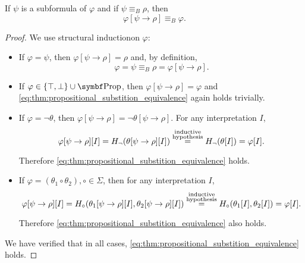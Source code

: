 \begin{proposition}\label{thm:propositional_substition_equivalence}
  If \( \psi \) is a subformula of \( \varphi \) and if \( \psi \equiv_B \rho \), then
  \begin{equation}\label{eq:thm:propositional_substition_equivalence}
    \varphi[\psi \to \rho] \equiv_B \varphi.
  \end{equation}
\end{proposition}
\begin{proof}
  We use structural induction\IND on \( \varphi \):

  \begin{itemize}
    \item If \( \varphi = \psi \), then \( \varphi[\psi \to \rho] = \rho \) and, by definition,
    \begin{equation*}
      \varphi = \psi \equiv_B \rho = \varphi[\psi \to \rho].
    \end{equation*}

    \item If \( \varphi \in \{ \top, \bot \} \cup \Bold{Prop} \), then \( \varphi[\psi \to \rho] = \varphi \) and \eqref{eq:thm:propositional_substition_equivalence} again holds trivially.

    \item If \( \varphi = \neg \theta \), then \( \varphi[\psi \to \rho] = \neg \theta[\psi \to \rho] \). For any interpretation \( I \),
    \begin{equation*}
      \varphi[\psi \to \rho][I]
      =
      H_{\neg} (\theta[\psi \to \rho][I])
      \overset {\substack{\text{inductive} \\ \text{hypothesis}}} =
      H_{\neg} (\theta[I])
      =
      \varphi[I].
    \end{equation*}

    Therefore \eqref{eq:thm:propositional_substition_equivalence} holds.

    \item If \( \varphi = (\theta_1 \circ \theta_2), \circ \in \Sigma \), then for any interpretation \( I \),
    \begin{equation*}
      \varphi[\psi \to \rho][I]
      =
      H_{\circ} (\theta_1[\psi \to \rho][I], \theta_2[\psi \to \rho][I])
      \overset {\substack{\text{inductive} \\ \text{hypothesis}}} =
      H_{\circ} (\theta_1[I], \theta_2[I])
      =
      \varphi[I].
    \end{equation*}

    Therefore \eqref{eq:thm:propositional_substition_equivalence} also holds.
  \end{itemize}

  We have verified that in all cases, \eqref{eq:thm:propositional_substition_equivalence} holds.
\end{proof}

